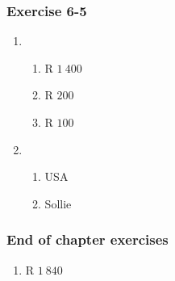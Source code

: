 \begin{multicols}{3}
\subsubsection*{Exercise 6-5} %
    \begin{enumerate}[noitemsep, label=\textbf{\arabic*}.]
	\item %
	\begin{enumerate}[noitemsep, label=\textbf{(\alph*)} ]
	    \item R $1~ 400$%
	    \item R $200$%
	    \item R $100$%
	\end{enumerate}

	\item %
	
	\begin{enumerate}[noitemsep, label=\textbf{(\alph*)} ]
	    \item USA %

	    \item Sollie %
	\end{enumerate}
    \end{enumerate}


\subsubsection*{End of chapter exercises} %
    \begin{enumerate}[label=\textbf{\arabic*}.]
	\item R $1 ~840$%


\end{enumerate}
\end{multicols}
